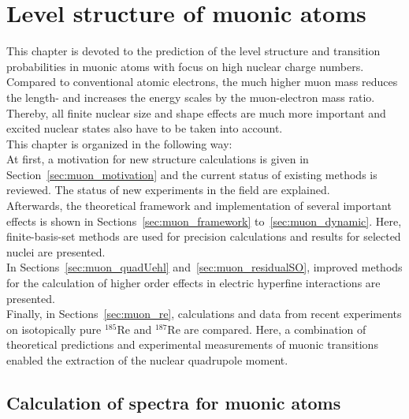 \chapter{Level structure of muonic atoms}
\label{ch:muonic_atoms}
This chapter is devoted to the prediction of the level structure and transition probabilities in muonic atoms with focus on high nuclear charge numbers. Compared to conventional atomic electrons, the much higher muon mass reduces the length- and  increases the energy scales by the muon-electron mass ratio. Thereby, all finite nuclear size and shape effects are much more important and excited nuclear states also have to be taken into account.\\
This chapter is organized in the following way:\\
At first, a motivation for new structure calculations is given in Section~\ref{sec:muon_motivation} and the current status of existing methods is reviewed. The status of new experiments in the field are explained.\\
Afterwards, the theoretical framework and implementation of several important effects is shown in Sections~\ref{sec:muon_framework} to~\ref{sec:muon_dynamic}. Here, finite-basis-set methods are used for precision calculations and results for selected nuclei are presented.\\
In Sections~\ref{sec:muon_quadUehl} and~\ref{sec:muon_residualSO}, improved methods for the calculation of higher order effects in electric hyperfine interactions are presented.\\
Finally, in Sections~\ref{sec:muon_re}, calculations and data from recent experiments on isotopically pure $^{185}$Re and $^{187}$Re are compared. Here, a combination of theoretical predictions and experimental measurements of muonic transitions enabled the extraction of the nuclear quadrupole moment.

\section{Calculation of spectra for muonic atoms}
\label{sec:calculationSpectraMuon}
